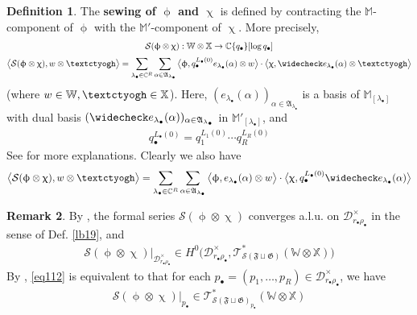 \documentclass[11pt,b5paper,notitlepage]{article}
\theoremstyle{definition}
\newtheorem{df}{Definition}[section]
\newtheorem{rem}[df]{Remark}
\theoremstyle{plain}
\newcommand{\fk}{\mathfrak}
\newcommand{\wch}{\widecheck}
\newcommand{\blt}{\bullet}
\newcommand{\Xbb}{\mathbb X}
\newcommand{\Wbb}{\mathbb W}
\newcommand{\Mbb}{\mathbb M}
\newcommand{\Cbb}{\mathbb C}
\newcommand{\<}{\left\langle}
\renewcommand{\>}{\right\rangle}
\newcommand{\ST}{\mathscr{T}}
\newcommand{\MD}{\mathcal{D}}
\newcommand{\MS}{\mathcal{S}}
\newcommand{\bigbk}[1]{\big\langle {#1}\big\rangle}
\newcommand{\ff}{\mathfrak{F}}
\newcommand{\fg}{\mathfrak{G}}
\newcommand{\tipaz}{\text{\textctyogh}}
\numberwithin{equation}{section}
\begin{document}
\begin{df}\label{lb42}
The \textbf{sewing of $\upphi$ and $\upchi$} is defined by contracting the $\Mbb$-component of $\upphi$ with the $\Mbb'$-component of $\upchi$. More precisely,
\begin{gather}
\begin{gathered}
\MS(\upphi\otimes\upchi):\Wbb\otimes\Xbb\rightarrow\Cbb\{q_\blt\}[\log q_\blt]\\[0.5ex]
\bigbk{\MS(\upphi\otimes\upchi),w\otimes \tipaz}=\sum_{\lambda_\blt\in\Cbb^R}\sum_{\alpha\in\fk A_{\lambda_\blt}}\bigbk{\upphi,q_\blt^{L_\blt(0)}e_{\lambda_\blt}(\alpha)\otimes w}\cdot \bigbk{\upchi,\wch e_{\lambda_\blt}(\alpha)\otimes\tipaz}
\end{gathered}
\end{gather}
(where $w\in\Wbb,\tipaz\in\Xbb$). Here, $(e_{\lambda_\blt}(\alpha))_{\alpha\in\fk A_{\lambda_\blt}}$ is a basis of $\Mbb_{[\lambda_\blt]}$ with dual basis $(\wch e_{\lambda_\blt}(\alpha))_{\alpha\in\fk A_{\lambda_\blt}}$ in $\Mbb'_{[\lambda_\blt]}$, and
\begin{align}\label{eq102}
q_\blt^{L_\blt(0)}=q_1^{L_1(0)}\cdots q_R^{L_R(0)}
\end{align}
See \cite[Sec. 4.1]{GZ2} for more explanations. Clearly we also have
\begin{gather}
\bigbk{\MS(\upphi\otimes\upchi),w\otimes \tipaz}=\sum_{\lambda_\blt\in\Cbb^R}\sum_{\alpha\in\fk A_{\lambda_\blt}}\bigbk{\upphi,e_{\lambda_\blt}(\alpha)\otimes w}\cdot \bigbk{\upchi,q_\blt^{L_\blt(0)}\wch e_{\lambda_\blt}(\alpha)}
\end{gather}
\end{df}

\begin{rem}
By \cite[Thm. 4.9]{GZ2}, the formal series $\MS(\upphi\otimes\upchi)$ converges a.l.u. on $\MD_{r_\blt\rho_\blt}^\times$ in the sense of Def. \ref{lb19}, and
\begin{align}\label{eq112}
\MS(\upphi\otimes\upchi)\big|_{\MD_{r_\blt\rho_\blt}^\times}\in H^0\big(\MD_{r_\blt\rho_\blt}^\times,\ST^*_{\MS(\ff\sqcup\fg)}(\Wbb\otimes\Xbb)\big)
\end{align}
By \cite[Rem. 3.1]{GZ2}, \eqref{eq112} is equivalent to that  for each $p_\blt=(p_1,\dots,p_R)\in\MD_{r_\blt\rho_\blt}^\times$, we have
\begin{align*}
\MS(\upphi\otimes\upchi)\big|_{p_\blt}\in \ST^*_{\MS(\ff\sqcup\fg)_{p_\blt}}(\Wbb\otimes\Xbb)
\end{align*}
\end{rem}
\end{document}
